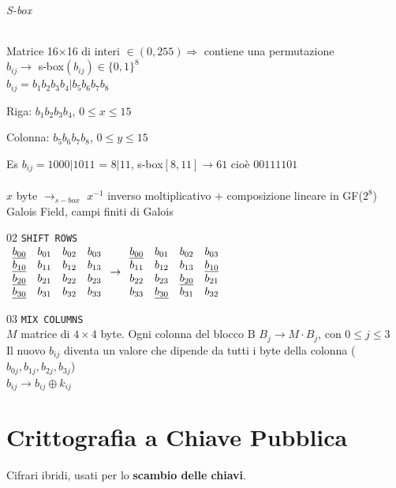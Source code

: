 \documentclass[10pt]{book}
\begin{document}
\subparagraph{S-box} Matrice 16$\times$16 di interi $\in(0, 255) \Rightarrow$ contiene una permutazione\\
$b_{ij} \rightarrow$ s-box$(b_{ij})\in\{0,1\}^8$\\
$b_{ij} = b_1b_2b_3b_4|b_5b_6b_7b_8$
\begin{list}{}{}
	\item Riga: $b_1b_2b_3b_4$, $0\leq x \leq 15$
	\item Colonna: $b_5b_6b_7b_8$, $0\leq y \leq 15$
\end{list}
Es $b_{ij} = 1000|1011$ = $8|11$, s-box$[8, 11] \rightarrow 61$ cioè $00111101$\\\\
$x$ byte $\longrightarrow_{s-box}$ $x^{-1}$ inverso moltiplicativo + composizione lineare in GF($2^8$)\\
Galois Field, campi finiti di Galois
\begin{list}{}{}
	\item[02] \texttt{SHIFT ROWS}\\
	$\begin{array}{c c c c}
\underline{b_{00}} & b_{01} & b_{02} & b_{03} \\
\underline{b_{10}} & b_{11} & b_{12} & b_{13} \\
\underline{b_{20}} & b_{21} & b_{22} & b_{23} \\
\underline{b_{30}} & b_{31} & b_{32} & b_{33} \\
\end{array} \rightarrow \begin{array}{c c c c}
\underline{b_{00}} & b_{01} & b_{02} & b_{03} \\
b_{11} & b_{12} & b_{13} & \underline{b_{10}} \\
b_{22} & b_{23} & \underline{b_{20}} & b_{21} \\
b_{33} & \underline{b_{30}} & b_{31} & b_{32} \\
\end{array}$
	\item[03] \texttt{MIX COLUMNS}\\
	$M$ matrice di $4\times 4$ byte. Ogni colonna del blocco B 
	$B_j \rightarrow M\cdot B_j$, con $0 \leq j \leq 3$\\
	Il nuovo $b_{ij}$ diventa un valore che dipende da tutti i byte della colonna ($b_{0j}, b_{1j}, b_{2j}, b_{3j}$)\\
	$b_{ij} \rightarrow b_{ij}\oplus k_{ij}$
\end{list}

\chapter{Crittografia a Chiave Pubblica}
Cifrari ibridi, usati per lo \textbf{scambio delle chiavi}.
\end{document}
